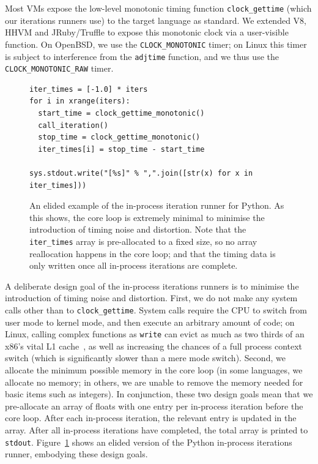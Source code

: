 \documentclass[a4paper,UKenglish]{lipics}
\begin{document}
Most VMs expose the low-level monotonic timing function \texttt{clock\_gettime}
(which our iterations runners use) to the target language as standard. We
extended V8, HHVM and JRuby/Truffle
to expose this monotonic clock via a user-visible function.
On OpenBSD, we use the \texttt{CLOCK\_MONOTONIC} timer; on Linux this timer is subject to
interference from the \texttt{adjtime} function, and we thus use the
\texttt{CLOCK\_MONOTONIC\_RAW} timer.

\begin{figure}[t]
\begin{lstlisting}
iter_times = [-1.0] * iters
for i in xrange(iters):
  start_time = clock_gettime_monotonic()
  call_iteration()
  stop_time = clock_gettime_monotonic()
  iter_times[i] = stop_time - start_time

sys.stdout.write("[%s]" % ",".join([str(x) for x in iter_times]))
\end{lstlisting}
\caption{An elided example of the in-process iteration runner for Python. As
this shows, the core loop is extremely minimal to minimise the introduction of
timing noise and distortion. Note that the \texttt{iter\_times} array is
pre-allocated to a fixed size, so no array reallocation happens in the core
loop; and that the timing data is only written once all in-process iterations
are complete.}
\label{fig:pythonitsrunner}
\end{figure}

A deliberate design goal of the in-process iterations runners is to minimise the
introduction of timing noise and distortion. First, we do not make any system
calls other than to \texttt{clock\_gettime}. System calls require the CPU to
switch from user mode to kernel mode, and then execute an arbitrary amount
of code; on Linux, calling complex functions as \texttt{write} can evict as much
as two thirds of an x86's vital L1 cache~\cite{soares10flexsc}, as well as
increasing the chances of a full process context switch (which is significantly
slower than a mere mode switch). Second, we allocate the minimum possible memory in
the core loop (in some languages, we allocate no memory; in others, we are
unable to remove the memory needed for basic items such as integers). In
conjunction, these two design goals mean that we pre-allocate an array of floats
with one entry per in-process iteration before the core loop. After each
in-process iteration, the relevant entry is updated in the array. After
all in-process iterations have completed, the total array is printed to
\texttt{stdout}. Figure~\ref{fig:pythonitsrunner} shows an elided version
of the Python in-process iterations runner, embodying these design goals.
\end{document}
